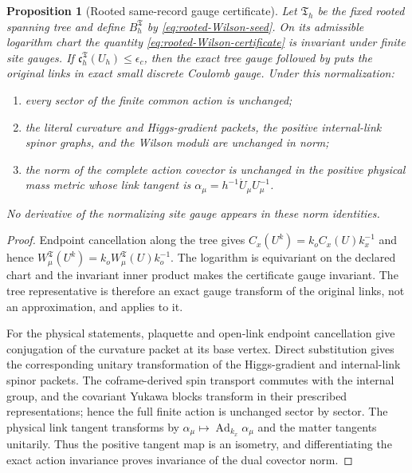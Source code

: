 \documentclass[11pt]{article}
\numberwithin{equation}{section}
\newtheorem{proposition}[proposition]{Proposition}
\theoremstyle{definition}
\theoremstyle{remark}
\begin{document}
\begin{proposition}[Rooted same-record gauge certificate]
\label{prop:rooted-gauge-certificate}
Let $\mathfrak T_h$ be the fixed rooted spanning tree and define
$B_h^{\mathfrak T}$ by \eqref{eq:rooted-Wilson-seed}.  On its admissible
logarithm chart the quantity \eqref{eq:rooted-Wilson-certificate} is invariant
under finite site gauges.  If
$\mathfrak c_h^{\mathfrak T}(U_h)\le\epsilon_c$, then the exact tree gauge
followed by  puts the original links
in exact small discrete Coulomb gauge.  Under this normalization:
\begin{enumerate}[label=\textup{(a)},leftmargin=2.8em]
\item every sector of the finite common action is unchanged;
\item the literal curvature and Higgs-gradient packets, the positive
      internal-link spinor graphs, and the Wilson moduli are unchanged in
      norm;
\item the norm of the complete action covector is unchanged in the positive
      physical mass metric whose link tangent is
      $\alpha_\mu=h^{-1}\dot U_\mu U_\mu^{-1}$.
\end{enumerate}
No derivative of the normalizing site gauge appears in these norm identities.
\end{proposition}
\begin{proof}
Endpoint cancellation along the tree gives
$C_x(U^k)=k_oC_x(U)k_x^{-1}$ and hence
$W_\mu^{\mathfrak T}(U^k)=k_oW_\mu^{\mathfrak T}(U)k_o^{-1}$.
The logarithm is equivariant on the declared chart and the invariant inner
product makes the certificate gauge invariant.  The tree representative is
therefore an exact gauge transform of the original links, not an
approximation, and  applies to it.

For the physical statements, plaquette and open-link endpoint cancellation
give conjugation of the curvature packet at its base vertex.  Direct
substitution gives the corresponding unitary transformation of the
Higgs-gradient and internal-link spinor packets.  The coframe-derived spin
transport commutes with the internal group, and the covariant Yukawa blocks
transform in their prescribed representations; hence the full finite action
is unchanged sector by sector.  The physical link tangent transforms by
$\alpha_\mu\mapsto\operatorname{Ad}_{k_x}\alpha_\mu$ and the matter tangents
unitarily.  Thus the positive tangent map is an isometry, and differentiating
the exact action invariance proves invariance of the dual covector norm.
\end{proof}
\end{document}
